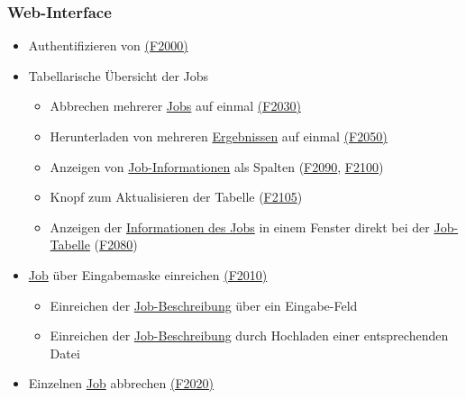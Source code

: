     \subsubsection{Web-Interface}
        \begin{itemize}[noitemsep]
            \item Authentifizieren von  \hyperref[FA:Web-Interface:Anmelden]{(F2000)}
            \item Tabellarische Übersicht  der Jobs
                \begin{itemize}[noitemsep]
                    \item Abbrechen mehrerer \hyperref[B:Jobs]{Jobs} auf einmal \hyperref[FA:Web-Interface:Abbruch mehrerer Jobs auf einmal]{(F2030)}
                    \item Herunterladen von mehreren \hyperref[B:Job-Ergebnis]{Ergebnissen} auf einmal \hyperref[FA:Web-Interface:herunterladen mehrerer Ergebnisse auf einmal]{(F2050)}
                    \item Anzeigen von \hyperref[B:Job-Informationen]{Job-Informationen} als Spalten (\hyperref[FA:Web-Interface:Hinzufügen von Spalten]{F2090}, \hyperref[FA:Web-Interface:Entfernen von Spalten]{F2100})
                    \item Knopf zum Aktualisieren der Tabelle  (\hyperref[FA:Web-Interface:Aktualisieren]{F2105})
                    \item Anzeigen der \hyperref[B:Job-Beschreibung]{Informationen des Jobs} in einem Fenster direkt bei der \hyperref[pages:job-table]{Job-Tabelle} (\hyperref[FA:Web-Interface:Einsehen von Job-Informationen]{F2080})
                \end{itemize}
            \item \hyperref[B:Jobs]{Job} über Eingabemaske einreichen \hyperref[FA:Web-Interface:Job einreichen]{(F2010)}
                \begin{itemize}[noitemsep]
                    \item Einreichen der \hyperref[B:Job-Beschreibung]{Job-Beschreibung} über ein Eingabe-Feld 
                    \item Einreichen der \hyperref[B:Job-Beschreibung]{Job-Beschreibung} durch Hochladen einer entsprechenden Datei
                \end{itemize}
            \item Einzelnen \hyperref[B:Jobs]{Job} abbrechen \hyperref[FA:Web-Interface:Abbruch eines einzelnen Jobs]{(F2020)}

\end{itemize}
